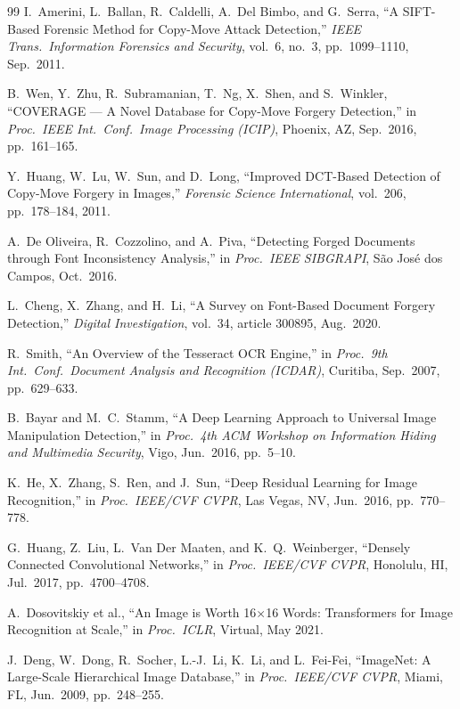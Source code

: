 \documentclass[12pt,a4paper,oneside]{report}
\begin{document}
\begin{thebibliography}{99}
I.~Amerini, L.~Ballan, R.~Caldelli, A.~Del Bimbo, and G.~Serra,
``A SIFT-Based Forensic Method for Copy-Move Attack Detection,''
\textit{IEEE Trans.\ Information Forensics and Security},
vol.~6, no.~3, pp.~1099--1110, Sep.\ 2011.
 
B.~Wen, Y.~Zhu, R.~Subramanian, T.~Ng, X.~Shen, and S.~Winkler,
``COVERAGE --- A Novel Database for Copy-Move Forgery Detection,''
in \textit{Proc.\ IEEE Int.\ Conf.\ Image Processing (ICIP)},
Phoenix, AZ, Sep.\ 2016, pp.~161--165.
 
Y.~Huang, W.~Lu, W.~Sun, and D.~Long,
``Improved DCT-Based Detection of Copy-Move Forgery in Images,''
\textit{Forensic Science International}, vol.~206, pp.~178--184, 2011.
 
A.~De Oliveira, R.~Cozzolino, and A.~Piva,
``Detecting Forged Documents through Font Inconsistency Analysis,''
in \textit{Proc.\ IEEE SIBGRAPI}, S\~{a}o Jos\'{e} dos Campos, Oct.\ 2016.
 
L.~Cheng, X.~Zhang, and H.~Li,
``A Survey on Font-Based Document Forgery Detection,''
\textit{Digital Investigation}, vol.~34, article 300895, Aug.\ 2020.
 
R.~Smith,
``An Overview of the Tesseract OCR Engine,''
in \textit{Proc.\ 9th Int.\ Conf.\ Document Analysis and Recognition (ICDAR)},
Curitiba, Sep.\ 2007, pp.~629--633.
 
B.~Bayar and M.~C.~Stamm,
``A Deep Learning Approach to Universal Image Manipulation Detection,''
in \textit{Proc.\ 4th ACM Workshop on Information Hiding and Multimedia Security},
Vigo, Jun.\ 2016, pp.~5--10.
 
K.~He, X.~Zhang, S.~Ren, and J.~Sun,
``Deep Residual Learning for Image Recognition,''
in \textit{Proc.\ IEEE/CVF CVPR}, Las Vegas, NV, Jun.\ 2016, pp.~770--778.
 
G.~Huang, Z.~Liu, L.~Van Der Maaten, and K.~Q.~Weinberger,
``Densely Connected Convolutional Networks,''
in \textit{Proc.\ IEEE/CVF CVPR}, Honolulu, HI, Jul.\ 2017, pp.~4700--4708.
 
A.~Dosovitskiy et al.,
``An Image is Worth 16$\times$16 Words: Transformers for Image Recognition at Scale,''
in \textit{Proc.\ ICLR}, Virtual, May 2021.
 
J.~Deng, W.~Dong, R.~Socher, L.-J.~Li, K.~Li, and L.~Fei-Fei,
``ImageNet: A Large-Scale Hierarchical Image Database,''
in \textit{Proc.\ IEEE/CVF CVPR}, Miami, FL, Jun.\ 2009, pp.~248--255.
 

\end{thebibliography}
\end{document}

